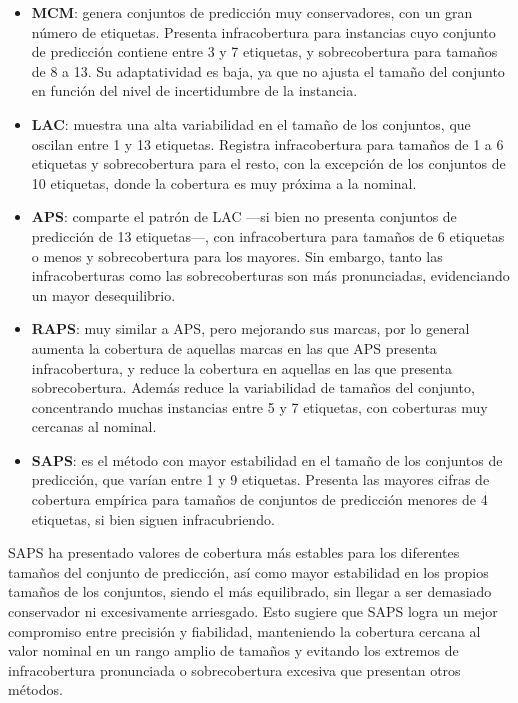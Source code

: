 \begin{itemize}
    
    \item \textbf{MCM}: genera conjuntos de predicción muy conservadores, con un gran número de etiquetas. Presenta infracobertura para instancias cuyo conjunto de predicción contiene entre 3 y 7 etiquetas, y sobrecobertura para tamaños de 8 a 13. Su adaptatividad es baja, ya que no ajusta el tamaño del conjunto en función del nivel de incertidumbre de la instancia.
    
    \item \textbf{LAC}: muestra una alta variabilidad en el tamaño de los conjuntos, que oscilan entre 1 y 13 etiquetas. Registra infracobertura para tamaños de 1 a 6 etiquetas y sobrecobertura para el resto, con la excepción de los conjuntos de 10 etiquetas, donde la cobertura es muy próxima a la nominal.
    
    \item \textbf{APS}: comparte el patrón de LAC ---si bien no presenta conjuntos de predicción de 13 etiquetas---, con infracobertura para tamaños de 6 etiquetas o menos y sobrecobertura para los mayores. Sin embargo, tanto las infracoberturas como las sobrecoberturas son más pronunciadas, evidenciando un mayor desequilibrio.
    
    \item \textbf{RAPS}: muy similar a APS, pero mejorando sus marcas, por lo general aumenta la cobertura de aquellas marcas en las que APS presenta infracobertura, y reduce la cobertura en aquellas en las que presenta sobrecobertura. Además reduce la variabilidad de tamaños del conjunto, concentrando muchas instancias entre 5 y 7 etiquetas, con coberturas muy cercanas al nominal. 

    \item \textbf{SAPS}: es el método con mayor estabilidad en el tamaño de los conjuntos de predicción, que varían entre 1 y 9 etiquetas. Presenta las mayores cifras de cobertura empírica para tamaños de conjuntos de predicción menores de 4 etiquetas, si bien siguen infracubriendo.
    
\end{itemize}

SAPS ha presentado valores de cobertura más estables para los diferentes tamaños del conjunto de predicción, así como mayor estabilidad en los propios tamaños de los conjuntos, siendo el más equilibrado, sin llegar a ser demasiado conservador ni excesivamente arriesgado. Esto sugiere que SAPS logra un mejor compromiso entre precisión y fiabilidad, manteniendo la cobertura cercana al valor nominal en un rango amplio de tamaños y evitando los extremos de infracobertura pronunciada o sobrecobertura excesiva que presentan otros métodos.

